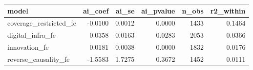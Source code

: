 \begin{tabular}{lrrrrr}
\hline
model & ai\_coef & ai\_se & ai\_pvalue & n\_obs & r2\_within \\
\hline
coverage\_restricted\_fe & -0.0100 & 0.0012 & 0.0000 & 1433 & 0.1464 \\
digital\_infra\_fe & 0.0358 & 0.0163 & 0.0283 & 2053 & 0.0366 \\
innovation\_fe & 0.0181 & 0.0038 & 0.0000 & 1832 & 0.0176 \\
reverse\_causality\_fe & -1.5583 & 1.7275 & 0.3672 & 1452 & 0.0111 \\
\hline
\end{tabular}